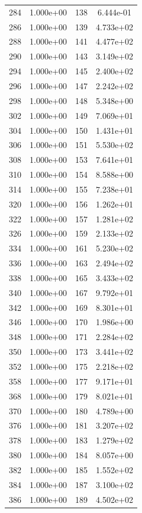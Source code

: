 \documentclass[12pt]{article}
\begin{document}
\begin{longtable}{@{}cccc@{}}
284 & 1.000e+00 & 138 & 6.444e-01 \\
286 & 1.000e+00 & 139 & 4.733e+02 \\
288 & 1.000e+00 & 141 & 4.477e+02 \\
290 & 1.000e+00 & 143 & 3.149e+02 \\
294 & 1.000e+00 & 145 & 2.400e+02 \\
296 & 1.000e+00 & 147 & 2.242e+02 \\
298 & 1.000e+00 & 148 & 5.348e+00 \\
302 & 1.000e+00 & 149 & 7.069e+01 \\
304 & 1.000e+00 & 150 & 1.431e+01 \\
306 & 1.000e+00 & 151 & 5.530e+02 \\
308 & 1.000e+00 & 153 & 7.641e+01 \\
310 & 1.000e+00 & 154 & 8.588e+00 \\
314 & 1.000e+00 & 155 & 7.238e+01 \\
320 & 1.000e+00 & 156 & 1.262e+01 \\
322 & 1.000e+00 & 157 & 1.281e+02 \\
326 & 1.000e+00 & 159 & 2.133e+02 \\
334 & 1.000e+00 & 161 & 5.230e+02 \\
336 & 1.000e+00 & 163 & 2.494e+02 \\
338 & 1.000e+00 & 165 & 3.433e+02 \\
340 & 1.000e+00 & 167 & 9.792e+01 \\
342 & 1.000e+00 & 169 & 8.301e+01 \\
346 & 1.000e+00 & 170 & 1.986e+00 \\
348 & 1.000e+00 & 171 & 2.284e+02 \\
350 & 1.000e+00 & 173 & 3.441e+02 \\
352 & 1.000e+00 & 175 & 2.218e+02 \\
358 & 1.000e+00 & 177 & 9.171e+01 \\
368 & 1.000e+00 & 179 & 8.021e+01 \\
370 & 1.000e+00 & 180 & 4.789e+00 \\
376 & 1.000e+00 & 181 & 3.207e+02 \\
378 & 1.000e+00 & 183 & 1.279e+02 \\
380 & 1.000e+00 & 184 & 8.057e+00 \\
382 & 1.000e+00 & 185 & 1.552e+02 \\
384 & 1.000e+00 & 187 & 3.100e+02 \\
386 & 1.000e+00 & 189 & 4.502e+02 \\

\end{longtable}
\end{document}

